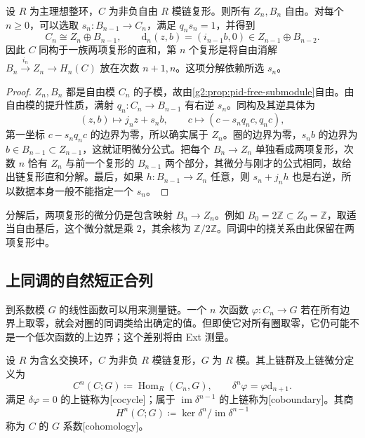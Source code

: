 \begin{lemma}\label{g2:lem:free-complex-splitting}
	设 \(R\) 为主理想整环，\(C\) 为非负自由 \(R\) 模链复形。则所有 \(Z_n,B_n\) 自由。对每个 \(n\ge0\)，可以选取 \(s_n:B_{n-1}\to C_n\)，满足 \(q_ns_n=1\)，并得到
	\[
		C_n\cong Z_n\oplus B_{n-1},\qquad
		\mathrm{d}_n(z,b)=(i_{n-1}b,0)\in Z_{n-1}\oplus B_{n-2}.
	\]
	因此 \(C\) 同构于一族两项复形的直和，第 \(n\) 个复形是将自由消解 \(B_n\xrightarrow{i_n}Z_n\to H_n(C)\) 放在次数 \(n+1,n\)。这项分解依赖所选 \(s_n\)。
\end{lemma}
\begin{proof}
	\(Z_n,B_n\) 都是自由模 \(C_n\) 的子模，故由\cref{g2:prop:pid-free-submodule}自由。由自由模的提升性质，满射 \(q_n:C_n\to B_{n-1}\) 有右逆 \(s_n\)。同构及其逆具体为
	\[
		(z,b)\longmapsto j_nz+s_nb,\qquad
		c\longmapsto(c-s_nq_nc,q_nc),
	\]
	第一坐标 \(c-s_nq_nc\) 的边界为零，所以确实属于 \(Z_n\)。圈的边界为零，\(s_nb\) 的边界为 \(b\in B_{n-1}\subset Z_{n-1}\)，这就证明微分公式。把每个 \(B_n\to Z_n\) 单独看成两项复形，次数 \(n\) 恰有 \(Z_n\) 与前一个复形的 \(B_{n-1}\) 两个部分，其微分与刚才的公式相同，故给出链复形直和分解。最后，如果 \(h:B_{n-1}\to Z_n\) 任意，则 \(s_n+j_nh\) 也是右逆，所以数据本身一般不能指定一个 \(s_n\)。
\end{proof}

分解后，两项复形的微分仍是包含映射 \(B_n\to Z_n\)。例如 \(B_0=2\mathbb Z\subset Z_0=\mathbb Z\)，取适当自由基后，这个微分就是乘 \(2\)，其余核为 \(\mathbb Z/2\mathbb Z\)。同调中的挠关系由此保留在两项复形中。

\subsection{上同调的自然短正合列}
\label{g2:subsec:0402:02}
到系数模 \(G\) 的线性函数可以用来测量链。一个 \(n\) 次函数 \(\varphi:C_n\to G\) 若在所有边界上取零，就会对圈的同调类给出确定的值。但即使它对所有圈取零，它仍可能不是一个低次函数的上边界；这个差别将由 Ext 测量。

\begin{definition}[系数上同调]\label{g2:def:cohomology-coefficients}
	设 \(R\) 为含幺交换环，\(C\) 为非负 \(R\) 模链复形，\(G\) 为 \(R\) 模。其上链群及上链微分定义为
	\[
		C^n(C;G)\coloneqq\operatorname{Hom}_R(C_n,G),\qquad
		\delta^n\varphi=\varphi\mathrm{d}_{n+1}.
	\]
	满足 \(\delta\varphi=0\) 的上链称为[cocycle]；属于 \(\operatorname{im}\delta^{n-1}\) 的上链称为[coboundary]。其商
	\[
		H^n(C;G)\coloneqq\ker\delta^n/\operatorname{im}\delta^{n-1}
	\]
	称为 \(C\) 的 \(G\) 系数[cohomology]。
\end{definition}

